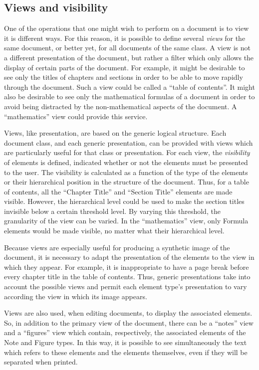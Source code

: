 \subsection{Views and visibility}

One of the operations that one might wish to perform on a document is
to view it is different ways.  For this reason, it is possible to
define several {\em views} for the same document, or better yet, for
all documents of the same class.  A view is not a different
presentation of the document, but rather a filter which only allows
the display of certain parts of the document.  For example, it might
be desirable to see only the titles of chapters and sections in order
to be able to move rapidly through the document.  Such a view could be
called a ``table of contents''.  It might also be desirable to see
only the mathematical formulas of a document in order to avoid being
distracted by the non-mathematical aspects of the document.  A
``mathematics'' view could provide this service.

Views, like presentation, are based on the generic logical structure.
Each document class, and each generic presentation, can be provided
with views which are particularly useful for that class or
presentation.  For each view, the {\em visibility} of elements is
defined, indicated whether or not the elements must be presented to
the user.  The visibility is calculated  as a function of the type of
the elements or their hierarchical position in the structure of the
document.  Thus, for a table of contents, all the ``Chapter Title''
and ``Section Title'' elements are made visible.  However, the
hierarchical level could be used to make the section titles invisible
below a certain threshold level.  By varying this threshold, the
granularity of the view can be varied.  In the ``mathematics'' view,
only Formula elements would be made visible, no matter what their
hierarchical level.

Because views are especially useful for producing a synthetic image of
the document, it is necessary to adapt the presentation of the
elements to the view in which they appear.  For example, it is
inappropriate to have a page break before every chapter title in the
table of contents.  Thus, generic presentations take into account the
possible views and permit each element type's presentation to vary
according the view in which its image appears.
\label{lesvues}

Views are also used, when editing documents, to display the associated
elements.  So, in addition to the primary view of the document, there
can be a ``notes'' view and a ``figures'' view which contain,
respectively, the associated elements of the Note and Figure types.
In this way, it is possible to see simultaneously the text which
refers to these elements and the elements themselves, even if they
will be separated when printed.

